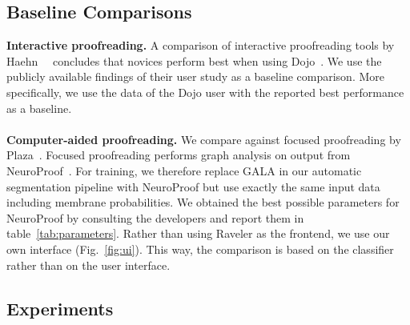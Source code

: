 \subsection{Baseline Comparisons}

\textbf{Interactive proofreading.} A comparison of interactive proofreading tools by Haehn~\etal~ concludes that novices perform best when using Dojo~\cite{haehn_dojo_2014}. We use the publicly available findings of their user study as a baseline comparison. More specifically, we use the data of the Dojo user with the reported best performance as a baseline.
\\~\\
\textbf{Computer-aided proofreading.} We compare against focused proofreading by Plaza~\cite{focused_proofreading}. Focused proofreading performs graph analysis on output from NeuroProof~\cite{neuroproof2013}. For training, we therefore replace GALA in our automatic segmentation pipeline with NeuroProof but use exactly the same input data including membrane probabilities. We obtained the best possible parameters for NeuroProof by consulting the developers and report them in table~\ref{tab:parameters}. Rather than using Raveler as the frontend, we use our own interface (Fig.~\ref{fig:ui}). This way, the comparison is based on the classifier rather than on the user interface.

\subsection{Experiments}

